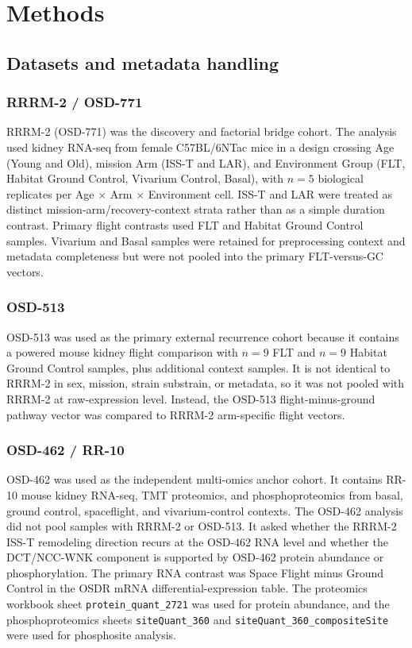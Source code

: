 \documentclass[11pt]{article}
\newcommand{\code}[1]{\texttt{#1}}
\begin{document}
\section{Methods}

\subsection{Datasets and metadata handling}

\subsubsection{RRRM-2 / OSD-771}

RRRM-2 (OSD-771) was the discovery and factorial bridge cohort. The analysis used kidney RNA-seq from female C57BL/6NTac mice in a design crossing Age (Young and Old), mission Arm (ISS-T and LAR), and Environment Group (FLT, Habitat Ground Control, Vivarium Control, Basal), with $n=5$ biological replicates per Age $\times$ Arm $\times$ Environment cell. ISS-T and LAR were treated as distinct mission-arm/recovery-context strata rather than as a simple duration contrast. Primary flight contrasts used FLT and Habitat Ground Control samples. Vivarium and Basal samples were retained for preprocessing context and metadata completeness but were not pooled into the primary FLT-versus-GC vectors.

\subsubsection{OSD-513}

OSD-513 was used as the primary external recurrence cohort because it contains a powered mouse kidney flight comparison with $n=9$ FLT and $n=9$ Habitat Ground Control samples, plus additional context samples. It is not identical to RRRM-2 in sex, mission, strain substrain, or metadata, so it was not pooled with RRRM-2 at raw-expression level. Instead, the OSD-513 flight-minus-ground pathway vector was compared to RRRM-2 arm-specific flight vectors.

\subsubsection{OSD-462 / RR-10}

OSD-462 was used as the independent multi-omics anchor cohort. It contains RR-10 mouse kidney RNA-seq, TMT proteomics, and phosphoproteomics from basal, ground control, spaceflight, and vivarium-control contexts. The OSD-462 analysis did not pool samples with RRRM-2 or OSD-513. It asked whether the RRRM-2 ISS-T remodeling direction recurs at the OSD-462 RNA level and whether the DCT/NCC-WNK component is supported by OSD-462 protein abundance or phosphorylation. The primary RNA contrast was Space Flight minus Ground Control in the OSDR mRNA differential-expression table. The proteomics workbook sheet \code{protein\_quant\_2721} was used for protein abundance, and the phosphoproteomics sheets \code{siteQuant\_360} and \code{siteQuant\_360\_compositeSite} were used for phosphosite analysis.
\end{document}
